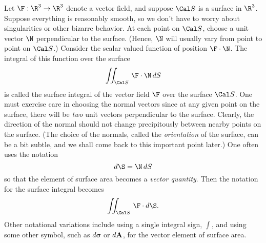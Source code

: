 Let $\F:\R^3 \to \R^3$ denote a vector field, and suppose
$\Cal S$ is a surface in $\R^3$.   Suppose everything is
reasonably smooth, so we don't have to worry about singularities
or other bizarre behavior.  At each point on $\Cal S$, choose
a unit vector $\N$ perpendicular to the surface.  (Hence, $\N$
will usually vary from point to  point on $\Cal S$.)  Consider
the scalar valued function of position  $\F\cdot \N$.  The
integral of this function over the surface
$$
\iint_{\Cal S}\,\F\cdot\N\,dS
$$
is called the surface
integral of the vector field $\F$ over the surface $\Cal S$.
One must exercise care in choosing the normal vectors since
at any given point on the surface, there will be {\it two\/}
unit vectors perpendicular to the surface.  Clearly, the direction
of the normal should not change precipitously between nearby
points on the surface.  (The choice of the normals, called the
{\it orientation\/} of the surface, can be a bit subtle, and we
shall come back to this important point later.)  One often uses
the notation
$$
     d\S = \N\,dS
$$
so that the element of surface area becomes a
{\it vector quantity}.  Then the notation for the surface
integral becomes
$$
   \iint_{\Cal S}\, \F\cdot d\S.
$$
\loadbold
Other notational variations include using a single integral
sign, $\int$, and using some other symbol, such as
$d\boldsymbol\sigma$ or $d\bold A$, for the vector element of
surface area.

